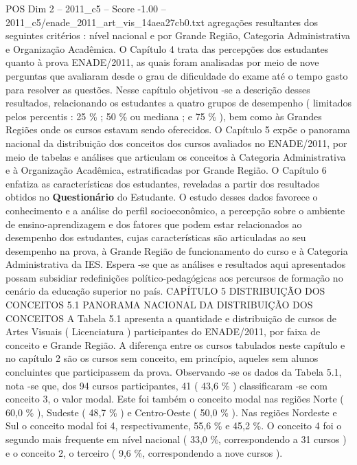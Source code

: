 \begin{textsample}{POS Dim 2 – 2011\_c5 – Score -1.00 – 2011\_c5/enade\_2011\_art\_vis\_14aea27cb0.txt}  \label{ex:f2_pos_348}
agregações resultantes dos seguintes critérios : nível nacional e por Grande Região, Categoria Administrativa e Organização Acadêmica.
O Capítulo 4 trata das percepções dos estudantes quanto à prova ENADE/2011, as quais foram analisadas por meio de nove perguntas que avaliaram desde o grau de dificuldade do exame até o tempo gasto para resolver as questões.
Nesse capítulo objetivou -se a descrição desses resultados, relacionando os estudantes a quatro grupos de desempenho ( limitados pelos percentis : 25 \% ; 50 \% ou mediana ; e 75 \% ), bem como às Grandes Regiões onde os cursos estavam sendo oferecidos.
O Capítulo 5 expõe o panorama nacional da distribuição dos conceitos dos cursos avaliados no ENADE/2011, por meio de tabelas e análises que articulam os conceitos à Categoria Administrativa e à Organização Acadêmica, estratificadas por Grande Região.
O Capítulo 6 enfatiza as características dos estudantes, reveladas a partir dos resultados obtidos no \textbf{Questionário} do Estudante.
O estudo desses dados favorece o conhecimento e a análise do perfil socioeconômico, a percepção sobre o ambiente de ensino-aprendizagem e dos fatores que podem estar relacionados ao desempenho dos estudantes, cujas características são articuladas ao seu desempenho na prova, à Grande Região de funcionamento do curso e à Categoria Administrativa da IES.
Espera -se que as análises e resultados aqui apresentados possam subsidiar redefinições político-pedagógicas aos percursos de formação no cenário da educação superior no país.
CAPÍTULO 5 DISTRIBUIÇÃO DOS CONCEITOS 5.1 PANORAMA NACIONAL DA DISTRIBUIÇÃO DOS CONCEITOS A Tabela 5.1 apresenta a quantidade e distribuição de cursos de Artes Visuais ( Licenciatura ) participantes do ENADE/2011, por faixa de conceito e Grande Região.
A diferença entre os cursos tabulados neste capítulo e no capítulo 2 são os cursos sem conceito, em princípio, aqueles sem alunos concluintes que participassem da prova.
Observando -se os dados da Tabela 5.1, nota -se que, dos 94 cursos participantes, 41 ( 43,6 \% ) classificaram -se com conceito 3, o valor modal.
Este foi também o conceito modal nas regiões Norte ( 60,0 \% ), Sudeste ( 48,7 \% ) e Centro-Oeste ( 50,0 \% ).
Nas regiões Nordeste e Sul o conceito modal foi 4, respectivamente, 55,6 \% e 45,2 \%.
O conceito 4 foi o segundo mais frequente em nível nacional ( 33,0 \%, correspondendo a 31 cursos ) e o conceito 2, o terceiro ( 9,6 \%, correspondendo a nove cursos ).

\end{textsample}
